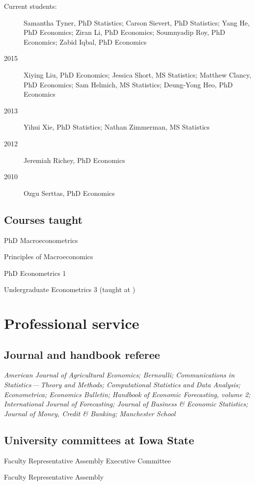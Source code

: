 \documentclass[12pt]{article}%
\newcommand{\allcaps}[1]{\textls{\MakeUppercase{#1}}}
\newcommand{\p}{\rlap{.}}
\begin{document}
\begin{description}
\item[Current students:]
Samantha Tyner, PhD Statistics;
Carson Sievert, PhD Statistics;
Yang He, PhD Economics;
Ziran Li, PhD Economics;
Soumnyadip Roy, PhD Economics;
Zabid Iqbal, PhD Economics
\item[2015] Xiying Liu, PhD Economics;
Jessica Short, MS Statistics;
Matthew Clancy, PhD Economics;
Sam Helmich, MS Statistics;
Deung-Yong Heo, PhD Economics
\item[2013] Yihui Xie, PhD Statistics; Nathan Zimmerman, MS Statistics
\item[2012] Jeremiah Richey, PhD Economics
\item[2010] Ozgu Serttas, PhD Economics
\end{description}

\subsection*{Courses taught}
\begin{description}[noitemsep]
\item[2011\,--\,present] PhD Macroeconometrics
\item[2010\,--\,present] Principles of Macroeconomics
\item[2009\,--\,present] PhD Econometrics 1
\item[2009\p] Undergraduate Econometrics 3 (taught at \allcaps{UCSD})
\end{description}

\section*{Professional service}

\subsection*{Journal and handbook referee}
\textit{American Journal of Agricultural Economics;
Bernoulli;
Communications in Statistics\,---\,Theory and Methods;
Computational Statistics and Data Analysis;
Econometrica;
Economics Bulletin;
Handbook of Economic Forecasting, volume 2;
International Journal of Forecasting;
Journal of Business \& Economic Statistics;
Journal of Money, Credit \& Banking;
Manchester School}

\subsection*{University committees at Iowa State}
\begin{description}[noitemsep]
\item[2014\,--\,present] Faculty Representative Assembly Executive
Committee
\item[2013\,--\,present] Faculty Representative Assembly
\end{description}
\end{document}
